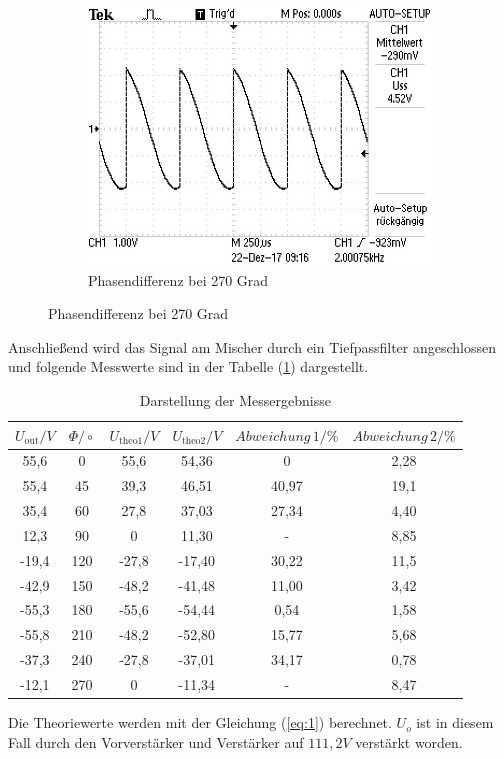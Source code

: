 \begin{figure}[H]
\begin{subfigure}{0.48\textwidth}
	\includegraphics[width=\textwidth]{270Grad.JPG}
  \caption{Phasendifferenz bei 270 Grad}
\end{subfigure}
\end{figure}

Anschließend wird das Signal am Mischer durch ein Tiefpassfilter angeschlossen und folgende
Messwerte sind in der Tabelle (\ref{tab:1}) dargestellt.
\begin{table}[H]
\centering
\caption{Darstellung der Messergebnisse}
\label{tab:1}
 \begin{tabular}{c c c c c c}
  \toprule
     $U_\text{out} / V$ & $\Phi/\circ$ & $U_\text{theo1} / V$ & $U_\text{theo2} / V$ & $Abweichung \, 1 / \%$ &$Abweichung \, 2 / \%$ \\
  \midrule
  55,6  & 0   & 55,6  &	54,36 &	0			 & 2,28\\
  55,4  & 45  & 39,3  & 46,51 &	40,97  & 19,1\\
  35,4  & 60  & 27,8  & 37,03 &	27,34  & 4,40\\
  12,3  & 90  & 0		  & 11,30 & -  		 & 8,85\\
  -19,4 & 120 &-27,8  &-17,40 & 30,22  & 11,5\\
  -42,9 & 150 &-48,2  &-41,48 & 11,00  & 3,42\\
  -55,3 & 180 &-55,6  &-54,44 & 0,54   & 1,58\\
  -55,8 & 210 &-48,2  &-52,80 & 15,77  & 5,68\\
  -37,3 & 240 &-27,8  &-37,01 & 34,17  & 0,78\\
  -12,1 & 270 &   0   &-11,34 & - 		 & 8,47\\
  \bottomrule
\end{tabular}
\end{table}
Die Theoriewerte werden mit der Gleichung (\ref{eq:1}) berechnet. $U_o$ ist in diesem Fall durch den Vorverstärker
und Verstärker auf $111,2 V$ verstärkt worden.\\

